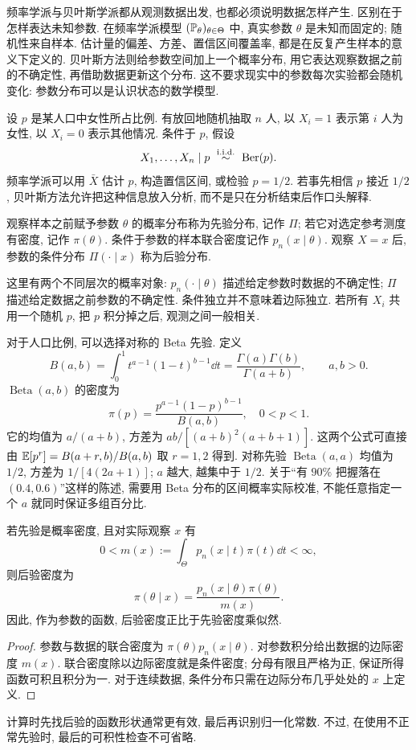 \label{chap:bayes}

频率学派与贝叶斯学派都从观测数据出发, 也都必须说明数据怎样产生. 区别在于怎样表达未知参数. 在频率学派模型 $(\mathbb P_\theta)_{\theta\in\Theta}$ 中, 真实参数 $\theta$ 是未知而固定的; 随机性来自样本. 估计量的偏差、方差、置信区间覆盖率, 都是在反复产生样本的意义下定义的. 贝叶斯方法则给参数空间加上一个概率分布, 用它表达观察数据之前的不确定性, 再借助数据更新这个分布. 这不要求现实中的参数每次实验都会随机变化: 参数分布可以是认识状态的数学模型. 

\begin{example}
设 $p$ 是某人口中女性所占比例. 有放回地随机抽取 $n$ 人, 以 $X_i=1$ 表示第 $i$ 人为女性, 以 $X_i=0$ 表示其他情况. 条件于 $p$, 假设
\[
 X_1,\ldots,X_n\mid p\ \iid\ \operatorname{Ber}(p).
\]
频率学派可以用 $\bar X$ 估计 $p$, 构造置信区间, 或检验 $p=1/2$. 若事先相信 $p$ 接近 $1/2$, 贝叶斯方法允许把这种信息放入分析, 而不是只在分析结束后作口头解释. 
\end{example}

\begin{definition}[先验与后验]
观察样本之前赋予参数 $\theta$ 的概率分布称为先验分布, 记作 $\Pi$; 若它对选定参考测度有密度, 记作 $\pi(\theta)$. 条件于参数的样本联合密度记作 $p_n(x\mid\theta)$. 观察 $X=x$ 后, 参数的条件分布 $\Pi(\cdot\mid x)$ 称为后验分布. 
\end{definition}
这里有两个不同层次的概率对象: $p_n(\cdot\mid\theta)$ 描述给定参数时数据的不确定性; $\Pi$ 描述给定数据之前参数的不确定性. 条件独立并不意味着边际独立. 若所有 $X_i$ 共用一个随机 $p$, 把 $p$ 积分掉之后, 观测之间一般相关. 

对于人口比例, 可以选择对称的 Beta 先验. 定义
\[
 B(a,b)=\int_0^1 t^{a-1}(1-t)^{b-1}\dd t
       =\frac{\Gamma(a)\Gamma(b)}{\Gamma(a+b)},\qquad a,b>0.
\]
$\operatorname{Beta}(a,b)$ 的密度为
\[
 \pi(p)=\frac{p^{a-1}(1-p)^{b-1}}{B(a,b)},\quad 0<p<1.
\]
它的均值为 $a/(a+b)$, 方差为 $ab/[(a+b)^2(a+b+1)]$. 这两个公式可直接由 $\mathbb E[p^r]=B(a+r,b)/B(a,b)$ 取 $r=1,2$ 得到. 对称先验 $\operatorname{Beta}(a,a)$ 均值为 $1/2$, 方差为 $1/[4(2a+1)]$; $a$ 越大, 越集中于 $1/2$. 关于“有 $90\%$ 把握落在 $(0.4,0.6)$”这样的陈述, 需要用 Beta 分布的区间概率实际校准, 不能任意指定一个 $a$ 就同时保证多组百分比. 

\begin{theorem}[后验密度]
若先验是概率密度, 且对实际观察 $x$ 有
\[
 0<m(x):=\int_\Theta p_n(x\mid t)\pi(t)\dd t<\infty,
\]
则后验密度为
\[
 \pi(\theta\mid x)=\frac{p_n(x\mid\theta)\pi(\theta)}{m(x)}.
\]
因此, 作为参数的函数, 后验密度正比于先验密度乘似然. 
\end{theorem}
\begin{proof}
参数与数据的联合密度为 $\pi(\theta)p_n(x\mid\theta)$. 对参数积分给出数据的边际密度 $m(x)$. 联合密度除以边际密度就是条件密度; 分母有限且严格为正, 保证所得函数可积且积分为一. 对于连续数据, 条件分布只需在边际分布几乎处处的 $x$ 上定义. 
\end{proof}
计算时先找后验的函数形状通常更有效, 最后再识别归一化常数. 不过, 在使用不正常先验时, 最后的可积性检查不可省略. 


